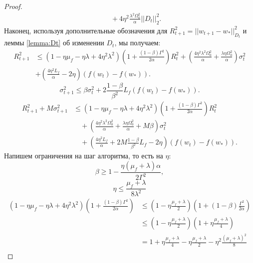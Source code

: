 \begin{proof}
\begin{equation*}
\begin{split}
    & \quad + 4\eta^2 \frac{\lambda^2\Omega_0^2}{\alpha} ||D_t||_2^2.
\end{split}
\end{equation*}
Наконец, используя дополнительные обозначения для $R_{t+1}^2 = ||w_{t+1} - w_*||_{D_{t}}^2$ и леммы \ref{lemma:Dt} об изменении $D_t$, мы получаем:
\begin{equation*}
\begin{split}
    R_{t+1}^2 &\leq \left(1 - \eta\mu_f - \eta\lambda+4\eta^2\lambda^2 \right)\left(1+\frac{(1-\beta)\Gamma^2}{2\alpha}\right)R_t^2 + \left( \frac{4\eta^2\lambda^2\Omega_0^2}{\alpha} + \frac{\lambda\eta\Omega_0^2}{\alpha}\right) \sigma_t^2 \\
    & + \left(\frac{4\eta^2L_f}{\alpha} - 2\eta\right) \left(f(w_t) - f(w_*) \right).
\end{split}
\end{equation*}
\begin{equation*}
    \sigma_{t+1}^2 \leq \beta \sigma_{t}^2 + 2\frac{1-\beta}{\beta^2}L_f (f(w_t) - f(w_*)).
\end{equation*}
\begin{equation*}
\begin{split}
    R_{t+1}^2 + M\sigma_{t+1}^2 &\leq  \left(1 - \eta\mu_f - \eta\lambda + 4\eta^2\lambda^2 \right)\left(1+\frac{(1-\beta)\Gamma^2}{2\alpha}\right)R_t^2 \\
    & \quad + \left( \frac{4\eta^2\lambda^2\Omega_0^2}{\alpha} + \frac{\lambda\eta\Omega_0^2}{\alpha} + M\beta\right) \sigma_t^2 \\
    & \quad + \left( \frac{4\eta^2L_f}{\alpha} + 2M\frac{1-\beta}{\beta^2}L_f - 2\eta\right) \left(f(w_t) - f(w_*) \right).
    \end{split}
\end{equation*}
Напишем ограничения на шаг алгоритма, то есть на  $\eta$: 
$$\beta \geq 1 - \frac{\eta(\mu_f+\lambda)\alpha}{2\Gamma^2},$$ 
$$\eta \leq \frac{\mu_f + \lambda}{8 \lambda^2}$$
\begin{equation*}
\begin{split}
    \left(1 - \eta\mu_f - \eta\lambda + 4\eta^2\lambda^2 \right)\left(1+\frac{(1-\beta)\Gamma^2}{2\alpha}\right) &\leq \left(1 - \eta \frac{\mu_f+\lambda}{2}\right) \left(1 + (1-\beta) \frac{\Gamma^2}{2\alpha} \right) \\
     &\leq \left(1 - \eta \frac{\mu_f+\lambda}{2}\right) \left(1 + \eta\frac{\mu_f + \lambda}{4} \right) \\
     & = 1 + \eta \frac{\mu_f + \lambda}{4} - \eta \frac{\mu_f + \lambda}{2} - \eta^2 \frac{(\mu_f+\lambda)^2}{8} \\

\end{split}
\end{equation*}
\end{proof}
